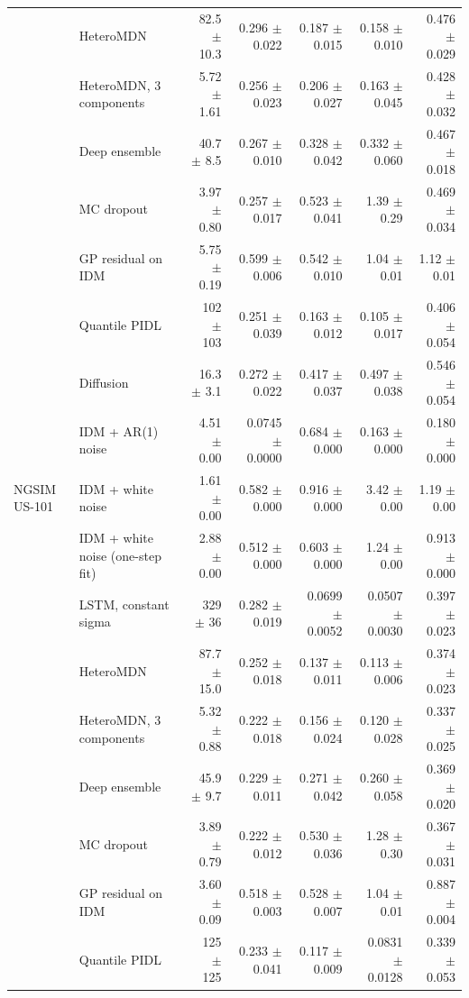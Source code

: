 \begin{longtable}{llrrrrr}
 & HeteroMDN & 82.5 $\pm$ 10.3 & 0.296 $\pm$ 0.022 & 0.187 $\pm$ 0.015 & 0.158 $\pm$ 0.010 & 0.476 $\pm$ 0.029 \\
 & HeteroMDN, 3 components & 5.72 $\pm$ 1.61 & 0.256 $\pm$ 0.023 & 0.206 $\pm$ 0.027 & 0.163 $\pm$ 0.045 & 0.428 $\pm$ 0.032 \\
 & Deep ensemble & 40.7 $\pm$ 8.5 & 0.267 $\pm$ 0.010 & 0.328 $\pm$ 0.042 & 0.332 $\pm$ 0.060 & 0.467 $\pm$ 0.018 \\
 & MC dropout & 3.97 $\pm$ 0.80 & 0.257 $\pm$ 0.017 & 0.523 $\pm$ 0.041 & 1.39 $\pm$ 0.29 & 0.469 $\pm$ 0.034 \\
 & GP residual on IDM & 5.75 $\pm$ 0.19 & 0.599 $\pm$ 0.006 & 0.542 $\pm$ 0.010 & 1.04 $\pm$ 0.01 & 1.12 $\pm$ 0.01 \\
 & Quantile PIDL & 102 $\pm$ 103 & 0.251 $\pm$ 0.039 & 0.163 $\pm$ 0.012 & 0.105 $\pm$ 0.017 & 0.406 $\pm$ 0.054 \\
 & Diffusion & 16.3 $\pm$ 3.1 & 0.272 $\pm$ 0.022 & 0.417 $\pm$ 0.037 & 0.497 $\pm$ 0.038 & 0.546 $\pm$ 0.054 \\
 & IDM + AR(1) noise & 4.51 $\pm$ 0.00 & 0.0745 $\pm$ 0.0000 & 0.684 $\pm$ 0.000 & 0.163 $\pm$ 0.000 & 0.180 $\pm$ 0.000 \\
\midrule
NGSIM US-101 & IDM + white noise & 1.61 $\pm$ 0.00 & 0.582 $\pm$ 0.000 & 0.916 $\pm$ 0.000 & 3.42 $\pm$ 0.00 & 1.19 $\pm$ 0.00 \\
 & IDM + white noise (one-step fit) & 2.88 $\pm$ 0.00 & 0.512 $\pm$ 0.000 & 0.603 $\pm$ 0.000 & 1.24 $\pm$ 0.00 & 0.913 $\pm$ 0.000 \\
 & LSTM, constant sigma & 329 $\pm$ 36 & 0.282 $\pm$ 0.019 & 0.0699 $\pm$ 0.0052 & 0.0507 $\pm$ 0.0030 & 0.397 $\pm$ 0.023 \\
 & HeteroMDN & 87.7 $\pm$ 15.0 & 0.252 $\pm$ 0.018 & 0.137 $\pm$ 0.011 & 0.113 $\pm$ 0.006 & 0.374 $\pm$ 0.023 \\
 & HeteroMDN, 3 components & 5.32 $\pm$ 0.88 & 0.222 $\pm$ 0.018 & 0.156 $\pm$ 0.024 & 0.120 $\pm$ 0.028 & 0.337 $\pm$ 0.025 \\
 & Deep ensemble & 45.9 $\pm$ 9.7 & 0.229 $\pm$ 0.011 & 0.271 $\pm$ 0.042 & 0.260 $\pm$ 0.058 & 0.369 $\pm$ 0.020 \\
 & MC dropout & 3.89 $\pm$ 0.79 & 0.222 $\pm$ 0.012 & 0.530 $\pm$ 0.036 & 1.28 $\pm$ 0.30 & 0.367 $\pm$ 0.031 \\
 & GP residual on IDM & 3.60 $\pm$ 0.09 & 0.518 $\pm$ 0.003 & 0.528 $\pm$ 0.007 & 1.04 $\pm$ 0.01 & 0.887 $\pm$ 0.004 \\
 & Quantile PIDL & 125 $\pm$ 125 & 0.233 $\pm$ 0.041 & 0.117 $\pm$ 0.009 & 0.0831 $\pm$ 0.0128 & 0.339 $\pm$ 0.053 \\

\end{longtable}
